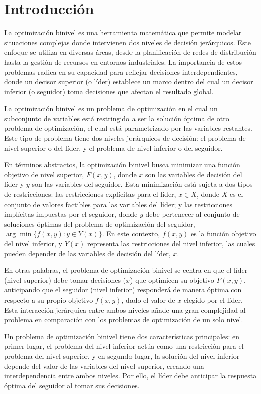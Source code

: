 \chapter{Introducción}
La optimización binivel es una herramienta matemática que permite modelar situaciones complejas donde intervienen dos niveles de decisión jerárquicos. Este enfoque se utiliza en diversas áreas, desde la planificación de redes de distribución hasta la gestión de recursos en entornos industriales. La importancia de estos problemas radica en su capacidad para reflejar decisiones interdependientes, donde un decisor superior (o líder) establece un marco dentro del cual un decisor inferior (o seguidor) toma decisiones que afectan el resultado global.

La optimización binivel es un problema de optimización en el cual un subconjunto de variables está restringido a ser la solución óptima de otro problema de optimización, el cual está parametrizado por las variables restantes. Este tipo de problema tiene dos niveles jerárquicos de decisión: el problema de nivel superior o del líder, y el problema de nivel inferior o del seguidor. 

En términos abstractos, la optimización binivel busca minimizar una función objetivo de nivel superior, $F(x, y)$, donde $x$ son las variables de decisión del líder y $y$ son las variables del seguidor. Esta minimización está sujeta a dos tipos de restricciones: las restricciones explícitas para el líder, $x \in X$, donde $X$ es el conjunto de valores factibles para las variables del líder; y las restricciones implícitas impuestas por el seguidor, donde $y$ debe pertenecer al conjunto de soluciones óptimas del problema de optimización del seguidor, $\arg\min\{f(x, y) : y \in Y(x)\}$. En este contexto, $f(x, y)$ es la función objetivo del nivel inferior, y $Y(x)$ representa las restricciones del nivel inferior, las cuales pueden depender de las variables de decisión del líder, $x$.

En otras palabras, el problema de optimización binivel se centra en que el líder (nivel superior) debe tomar decisiones ($x$) que optimicen su objetivo $F(x, y)$, anticipando que el seguidor (nivel inferior) responderá de manera óptima con respecto a su propio objetivo $f(x, y)$, dado el valor de $x$ elegido por el líder. Esta interacción jerárquica entre ambos niveles añade una gran complejidad al problema en comparación con los problemas de optimización de un solo nivel.

Un problema de optimización binivel tiene dos características principales: en primer lugar, el problema del nivel inferior actúa como una restricción para el problema del nivel superior, y en segundo lugar, la solución del nivel inferior depende del valor de las variables del nivel superior, creando una interdependencia entre ambos niveles. Por ello, el líder debe anticipar la respuesta óptima del seguidor al tomar sus decisiones.

